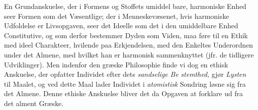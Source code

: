 En Grundanskuelse, der i Formens og Stoffets umiddel\-%
bare, harmoniske Enhed seer Formen som det Væsentlige; der
i Menneskevæsenet, hvis harmoniske Udfoldelse er Livsopgaven,
seer det Ideelle som det i den umiddelbare Enhed Constitutive,
og som derfor bestemmer Dyden som Viden, maa føre til en
Ethik med ideel Charakteer, hvilende paa Erkjendelsen, med
den Enkeltes Underordnen under det Almene, med hvilket
han er harmonisk sammenknyttet (jfr. de tidligere Udviklinger).
Men indenfor den græske Philosophie finde vi dog en ethisk
Anskuelse, der opfatter Individet efter dets \emph{sandselige Be\-%
stemthed,} gjør \emph{Lysten} til Maalet, og ved dette Maal lader
Individet i \emph{atomistisk} Sondring løsne sig fra det Almene.
Denne ethiske Anskuelse bliver det da Opgaven at forklare
ud fra det alment Græske.

